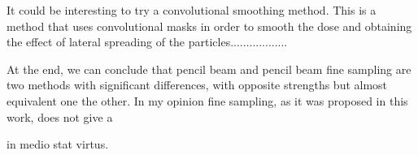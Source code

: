 \documentclass[12pt, a4paper, twoside]{book}
\begin{document}
It could be interesting to try a convolutional smoothing method. %
This is a method that uses convolutional masks in order to smooth the dose and obtaining the effect of lateral spreading of the particles..................


At the end, we can conclude that pencil beam and pencil beam fine sampling are two methods with significant differences, with opposite strengths but almost equivalent one the other. In my opinion fine sampling, as it was proposed in this work, does not give a 

in medio stat virtus.



\listoffigures
\listoftables
\end{document}
